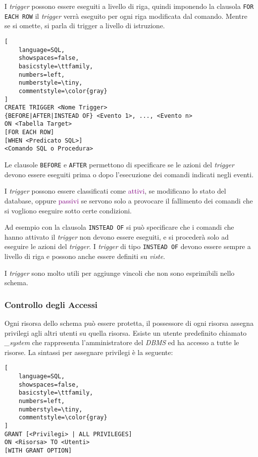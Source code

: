 I \emph{trigger} possono essere eseguiti a livello di riga, quindi imponendo
la clausola \verb|FOR EACH ROW| il \emph{trigger} verrà eseguito per ogni riga modificata
dal comando. Mentre se si omette, si parla di trigger a livello di istruzione.

\begin{lstlisting}[
    language=SQL,
    showspaces=false,
    basicstyle=\ttfamily,
    numbers=left,
    numberstyle=\tiny,
    commentstyle=\color{gray}
]
CREATE TRIGGER <Nome Trigger>
{BEFORE|AFTER|INSTEAD OF} <Evento 1>, ..., <Evento n>
ON <Tabella Target>
[FOR EACH ROW]
[WHEN <Predicato SQL>]
<Comando SQL o Procedura>
\end{lstlisting}

Le clausole \verb|BEFORE| e \verb|AFTER| permettono di specificare
se le azioni del \emph{trigger} devono essere eseguiti prima o dopo l'esecuzione dei comandi
indicati negli eventi.

I \emph{trigger} possono essere classificati come \textcolor{purple}{attivi}, se modificano
lo stato del database, oppure \textcolor{purple}{passivi} se servono solo a provocare il fallimento
dei comandi che si vogliono eseguire sotto certe condizioni.

Ad esempio con la clausola \verb|INSTEAD OF| si può specificare che
i comandi che hanno attivato il \emph{trigger} non devono essere eseguiti, e si procederà
solo ad eseguire le azioni del \emph{trigger}. I \emph{trigger} di tipo \verb|INSTEAD OF|
devono essere sempre a livello di riga e possono anche essere definiti su \emph{viste}.

I \emph{trigger} sono molto utili per aggiunge vincoli che non sono esprimibili nello schema.

\subsubsection{Controllo degli Accessi}

Ogni risorsa dello schema può essere protetta, il possessore di ogni risorsa
assegna privilegi agli altri utenti su quella risorsa. Esiste un utente predefinito chiamato
\emph{\_system} che rappresenta l'amministratore del \emph{DBMS} ed ha accesso a tutte le risorse.
La sintassi per assegnare privilegi è la seguente:

\begin{lstlisting}[
    language=SQL,
    showspaces=false,
    basicstyle=\ttfamily,
    numbers=left,
    numberstyle=\tiny,
    commentstyle=\color{gray}
]
GRANT [<Privilegi> | ALL PRIVILEGES]
ON <Risorsa> TO <Utenti> 
[WITH GRANT OPTION]
\end{lstlisting}

